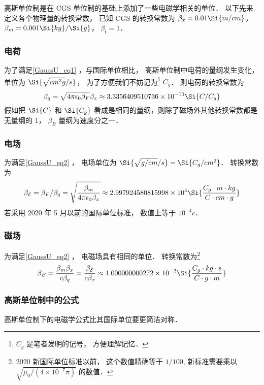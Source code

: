

高斯单位制是在 CGS 单位制的基础上添加了一些电磁学相关的单位． 以下先来定义各个物理量的转换常数， 
已知 CGS 的转换常数为 $\beta_x = 0.01\Si{m/cm}$， $\beta_m = 0.001\Si{kg}/\Si{g}$， $\beta_t = 1$．

\subsubsection{电荷}
为了满足\autoref{GaussU_eq1} ，与国际单位相比， 高斯单位制中电荷的量纲发生变化， 单位为 $\Si{\sqrt{cm^3 g}/s}$， 为了方便我们不妨记为\footnote{$C_g$ 是笔者发明的记号， 方便理解记忆．} $C_g$． 则电荷的转换常数为
\begin{equation}
\beta_q = \sqrt{4\pi\epsilon_0\beta_F} \beta_x \approx 3.3356409510736\times 10^{-10} \Si{C/C_g}
\end{equation}
假如把 $\Si{C}$ 和 $\Si{C_g}$ 看成是相同的量纲，则除了磁场外其他转换常数都是无量纲的 1， $\beta_B$ 量纲为速度分之一．

\subsubsection{电场}
为满足\autoref{GaussU_eq2} ， 电场单位为 $\Si{\sqrt{g/cm}/s} = \Si{C_g/cm^2}$． 转换常数为
\begin{equation}
\beta_{\mathcal E} = \beta_F/\beta_q = \sqrt{\frac{\beta_m}{4\pi\epsilon_0 \beta_x}} \approx 2.997924580815998\times 10^4 \Si{\frac{C_g\cdot m\cdot kg}{C\cdot cm\cdot g}}
\end{equation}
若采用 2020 年 5 月以前的国际单位标准， 数值上等于 $10^{-4} c$．

\subsubsection{磁场}
为满足\autoref{GaussU_eq2} ， 电磁场具有相同的单位． 转换常数为\footnote{2020 新国际单位标准以前， 这个数值精确等于 $1/100$, 新标准需要乘以 $\sqrt{\mu_0/(4\times 10^{-7}\pi)}$ 的数值．}
\begin{equation}
\beta_B = \frac{\beta_m\beta_x}{c\beta_q} = \frac{\beta_{\mathcal E}}{c\beta_x} \approx 1.000000000272\times 10^{-2} \Si{\frac{C_g\cdot kg \cdot s}{C \cdot g \cdot m}}
\end{equation}

\subsubsection{高斯单位制中的公式}
高斯单位制下的电磁学公式比其国际单位要更简洁对称．

